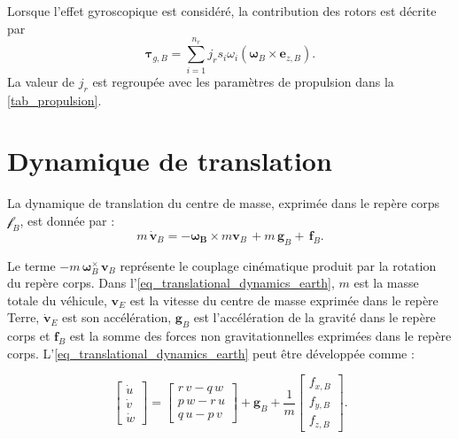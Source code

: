 \documentclass[11pt,a4paper,oneside]{report}
\newcommand{\vect}[1]{\bm{#1}}
\begin{document}
	Lorsque l'effet gyroscopique est considéré, la contribution des rotors est décrite par
	\begin{equation}
		\vect\tau_{g,B}=\sum_{i=1}^{n_r}j_r s_i\omega_i\left(\vect\omega_B\times\vect e_{z,B}\right).
		\label{eq_gyro_torque}
	\end{equation}
	La valeur de $j_r$ est regroupée avec les paramètres de propulsion dans la \cref{tab_propulsion}.
	
	\section{Dynamique de translation}
	
	La dynamique de translation du centre de masse, exprimée dans le repère corps \(\mathcal{f}_B\), est donnée par :
	\begin{equation}
		m\,\dot{\mathbf{v}}_B= -\boldsymbol{\omega_B} \times m\mathbf{v}_B\,+ m\,\mathbf{g}_B+ \,\mathbf{f}_B.
		\label{eq_translational_dynamics_earth}
	\end{equation}
	
	
	
	Le terme \(-m\,\boldsymbol{\omega}_B^{\times}\,\mathbf{v}_B\) représente le couplage cinématique produit par la rotation du repère corps. Dans l'\cref{eq_translational_dynamics_earth}, \(m\) est la masse totale du véhicule, \(\mathbf{v}_E\) est la vitesse du centre de masse exprimée dans le repère Terre, \(\dot{\mathbf{v}}_E\) est son accélération,
	\(\mathbf{g}_B\) est l'accélération de la gravité dans le repère corps et \(\mathbf{f}_B\) est la somme des forces non gravitationnelles exprimées dans le repère corps.
	L'\cref{eq_translational_dynamics_earth} peut être développée comme :
	
	\begin{equation}
		\begin{bmatrix}
			\dot{u}\\
			\dot{v}\\
			\dot{w}
		\end{bmatrix}
		=
		\begin{bmatrix}
			r\,v-q\,w\\
			p\,w-r\,u\\
			q\,u-p\,v
		\end{bmatrix}
		+\mathbf{g}_B+\frac{1}{m}
		\begin{bmatrix}
			f_{x,B}\\
			f_{y,B}\\
			f_{z,B}
		\end{bmatrix}.
		\label{eq_translational_dynamics_body_expanded}
	\end{equation}
	
\end{document}
